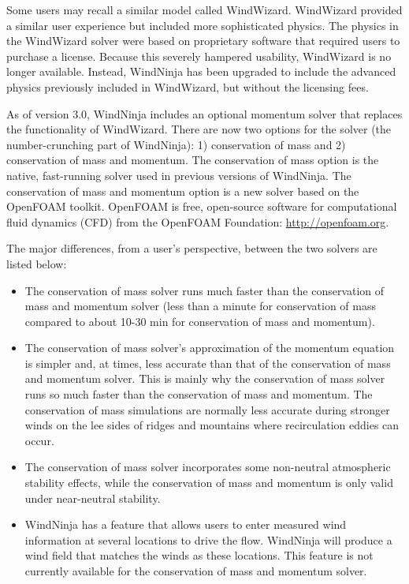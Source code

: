 \documentclass[12pt]{article}
\begin{document}
Some users may recall a similar model called WindWizard. WindWizard provided a similar user experience but included more sophisticated physics. The physics in the WindWizard solver were based on proprietary software that required users to purchase a license. Because this severely hampered usability, WindWizard is no longer available. Instead, WindNinja has been upgraded to include the advanced physics previously included in WindWizard, but without the licensing fees.

As of version 3.0, WindNinja includes an optional momentum solver that replaces the functionality of WindWizard. There are now two options for the solver (the number-crunching part of WindNinja): 1) conservation of mass and 2) conservation of mass and momentum. The conservation of mass option is the native, fast-running solver used in previous versions of WindNinja. The conservation of mass and momentum option is a new solver based on the OpenFOAM toolkit. OpenFOAM is free, open-source software for computational fluid dynamics (CFD) from the OpenFOAM Foundation: \url{http://openfoam.org}. 

The major differences, from a user’s perspective, between the two solvers are listed below:

\begin{itemize}
\item The conservation of mass solver runs much faster than the conservation of mass and momentum solver (less than a minute for conservation of mass compared to about 10-30 min for conservation of mass and momentum).
\item The conservation of mass solver's approximation of the momentum equation is simpler and, at times, less accurate than that of the conservation of mass and momentum solver. This is mainly why the conservation of mass solver runs so much faster than the conservation of mass and momentum.  The conservation of mass simulations are normally less accurate during stronger winds on the lee sides of ridges and mountains where recirculation eddies can occur.
\item The conservation of mass solver incorporates some non-neutral atmospheric stability effects, while the conservation of mass and momentum is only valid under near-neutral stability.
\item WindNinja has a feature that allows users to enter measured wind information at several locations to drive the flow.  WindNinja will produce a wind field that matches the winds as these locations.  This feature is not currently available for the conservation of mass and momentum solver.\end{itemize}
\end{document}
